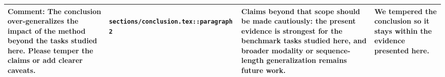 \documentclass[11pt]{article}
\begin{document}
\begin{longtable}{|p{}|p{}|p{}|p{}|}
\hline
\textbf{ Comment: } The conclusion over-generalizes the impact of the method beyond the tasks studied here. Please temper the claims or add clearer caveats. & \texttt{ sections/conclusion.tex::paragraph 2 } & {\color{blue}\ttfamily Claims beyond that scope should be made cautiously: the present evidence is strongest for the benchmark tasks studied here, and broader modality or sequence-length generalization remains future work.} & We tempered the conclusion so it stays within the evidence presented here. \\
\hline
\end{longtable}
\end{document}

